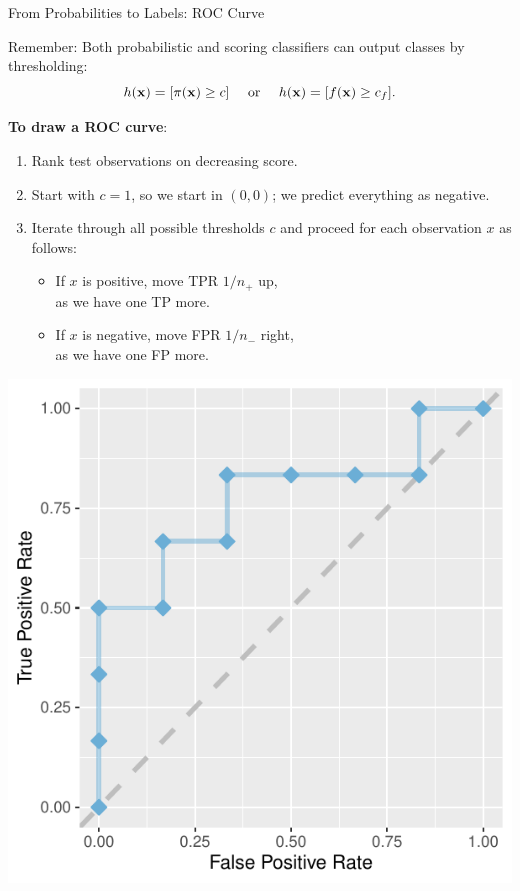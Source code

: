 \documentclass[11pt,compress,t,notes=noshow, xcolor=table]{beamer}
\begin{document}
\begin{vbframe}{From Probabilities to Labels: ROC Curve}

Remember: Both probabilistic and scoring classifiers can output classes by 
thresholding:
$$h(\mathbf{x}) = [\pi(\mathbf{x}) \ge c] \quad \text{ or } \quad h(\mathbf{x}) = [f(\mathbf{x}) \ge c_f].$$


\textbf{To draw a ROC curve}:

\lz

\begin{minipage}[b]{0.65\textwidth}
  \footnotesize
  \begin{enumerate}
    \item Rank test observations on decreasing score.
    \item Start with $c = 1$, so we start in $(0, 0)$; we predict everything as
    negative.
    \item Iterate through all possible thresholds $c$ and proceed for each
    observation $x$ as follows:
    \begin{itemize}
      \footnotesize
      \item If $x$ is positive, move TPR $1/n_+$ up, \\as we have one TP more.
      \item If $x$ is negative, move FPR $1/n_-$ right, \\as we have one FP 
      more.
    \end{itemize}
  \end{enumerate}
\end{minipage}%
\begin{minipage}[b]{0.35\textwidth}
  \centering
  \includegraphics[width=\textwidth]{figure/eval_mclass_roc_sp_4}
\end{minipage}

\end{vbframe}
\end{document}
